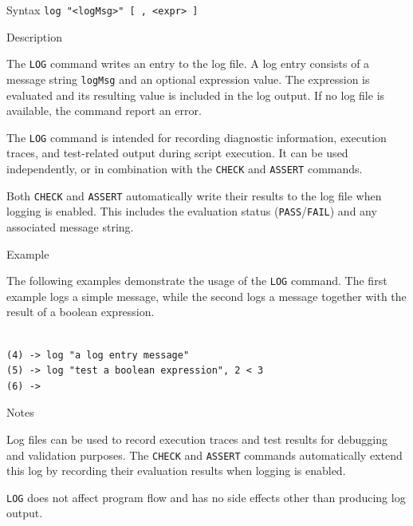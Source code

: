 %
%
\pagebreak


\begin{iPageDescEntry}{Syntax}
\texttt{log  "<logMsg>"  [ , <expr> ]}
\end{iPageDescEntry}

\begin{iPageDescEntry}{Description}

The \texttt{LOG} command writes an entry to the log file. A log entry consists of a message string \texttt{logMsg} and an optional expression value. The expression is evaluated and its resulting value is included in the log output. If no log file is available, the command report an error.

The \texttt{LOG} command is intended for recording diagnostic information, execution traces, and test-related output during script execution. It can be used independently, or in combination with the \texttt{CHECK} and \texttt{ASSERT} commands.

Both \texttt{CHECK} and \texttt{ASSERT} automatically write their results to the log file when logging is enabled. This includes the evaluation status (\texttt{PASS}/\texttt{FAIL}) and any associated message string.

\end{iPageDescEntry}

\begin{iPageDescEntry}{Example}

The following examples demonstrate the usage of the \texttt{LOG} command. The first example logs a simple message, while the second logs a message together with the result of a boolean expression.

\begin{lstlisting}[style=iPageOpStyle]

(4) -> log "a log entry message"
(5) -> log "test a boolean expression", 2 < 3
(6) ->

\end{lstlisting}
\end{iPageDescEntry}

\begin{iPageDescEntry}{Notes}

Log files can be used to record execution traces and test results for debugging and validation purposes. The \texttt{CHECK} and \texttt{ASSERT} commands automatically extend this log by recording their evaluation results when logging is enabled.

\texttt{LOG} does not affect program flow and has no side effects other than producing log output.

\end{iPageDescEntry}